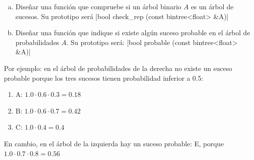\documentclass[10pt,a4paper,spanish]{report}
\begin{document}
\begin{enumerate}[a)]
      \item Diseñar una función que compruebe si un árbol binario $A$ es un árbol de sucesos. Su prototipo será |bool check_rep (const bintree<float> &A)|
      \item Diseñar una función que indique si existe algún suceso probable en el árbol de probabilidades $A$. Su prototipo será: |bool probable (const bintree<float> &A)|
\end{enumerate}

\noindent
Por ejemplo: en el árbol de probabilidades de la derecha no existe un suceso probable porque los tres sucesos tienen probabilidad inferior a 0.5:
\begin{enumerate}[---]
      \item A: $1.0 \cdot 0.6 \cdot 0.3 = 0.18$
      \item B: $1.0 \cdot 0.6 \cdot 0.7 = 0.42$
      \item C: $1.0 \cdot 0.4 = 0.4$
\end{enumerate}

\noindent
En cambio, en el árbol de la izquierda hay un suceso probable: E, porque $1.0 \cdot 0.7 \cdot 0.8 = 0.56$
\end{document}
